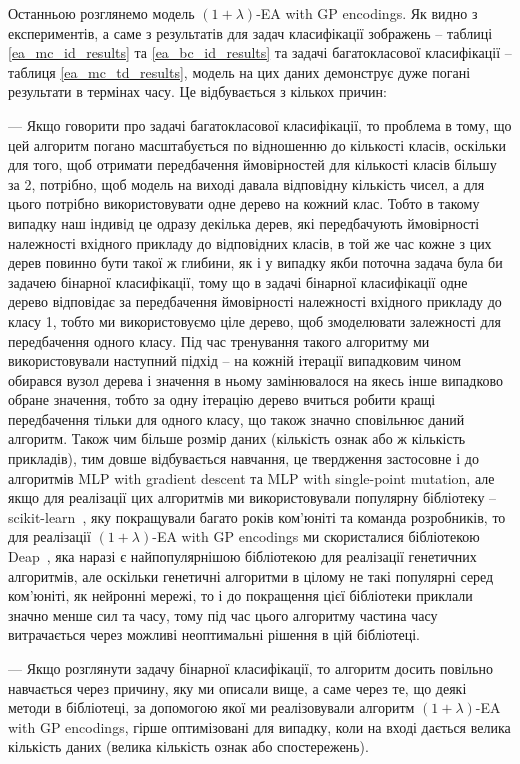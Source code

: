Останньою розглянемо модель $(1+\lambda)$-EA with GP encodings. Як видно з експериментів, а саме з результатів для задач класифікації зображень -- таблиці \ref{ea_mc_id_results} та \ref{ea_bc_id_results} та задачі багатокласової класифікації -- таблиця \ref{ea_mc_td_results}, модель на цих даних демонструє дуже погані результати в термінах часу. Це відбувається з кількох причин: 

--- Якщо говорити про задачі багатокласової класифікації, то проблема в тому, що цей алгоритм погано масштабується по відношенню до кількості класів, оскільки для того, щоб отримати передбачення ймовірностей для кількості класів більшу за 2, потрібно, щоб модель на виході давала відповідну кількість чисел, а для цього потрібно використовувати одне дерево на кожний клас. Тобто в такому випадку наш індивід це одразу декілька дерев, які передбачують ймовірності належності вхідного прикладу до відповідних класів, в той же час кожне з цих дерев повинно бути такої ж глибини, як і у випадку якби поточна задача була би задачею бінарної класифікації, тому що в задачі бінарної класифікації одне дерево відповідає за передбачення ймовірності належності вхідного прикладу до класу 1, тобто ми використовуємо ціле дерево, щоб змоделювати залежності для передбачення одного класу. Під час тренування такого алгоритму ми використовували наступний підхід -- на кожній ітерації випадковим чином обирався вузол дерева і значення в ньому замінювалося на якесь інше випадково обране значення, тобто за одну ітерацію дерево вчиться робити кращі передбачення тільки для одного класу, що також значно сповільнює даний алгоритм. Також чим більше розмір даних (кількість ознак або ж кількість прикладів), тим довше відбувається навчання, це твердження застосовне і до алгоритмів MLP with gradient descent та MLP with single-point mutation, але якщо для реалізації цих алгоритмів ми використовували популярну бібліотеку -- scikit-learn~\cite{ct20}, яку покращували багато років ком'юніті та команда розробників, то для реалізації $(1+\lambda)$-EA with GP encodings ми скористалися бібліотекою Deap~\cite{ct19}, яка наразі є найпопулярнішою бібліотекою для реалізації генетичних алгоритмів, але оскільки генетичні алгоритми в цілому не такі популярні серед ком'юніті, як нейронні мережі, то і до покращення цієї бібліотеки приклали значно менше сил та часу, тому під час цього алгоритму частина часу витрачається через можливі неоптимальні рішення в цій бібліотеці.

--- Якщо розглянути задачу бінарної класифікації, то алгоритм досить повільно навчається через причину, яку ми описали вище, а саме через те, що деякі методи в бібліотеці, за допомогою якої ми реалізовували алгоритм $(1+\lambda)$-EA with GP encodings, гірше оптимізовані для випадку, коли на вході дається велика кількість даних (велика кількість ознак або спостережень).

